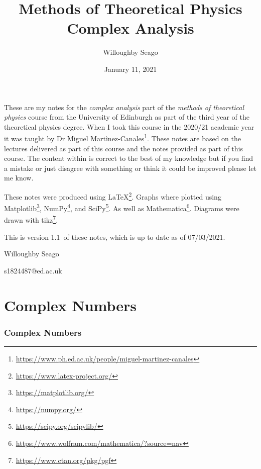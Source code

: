 \documentclass{article}
\author{Willoughby Seago}
\date{January 11, 2021}
\title{
    Methods of Theoretical Physics\\
    {\Large Complex Analysis}
}
\newcommand{\notesVersion}{1.1}
\newcommand{\notesDate}{07/03/2021}
\begin{document}
    \maketitle
    These are my notes for the \textit{complex analysis} part of the \textit{methods of theoretical physics} course from the University of Edinburgh as part of the third year of the theoretical physics degree.
    When I took this course in the 2020/21 academic year it was taught by Dr Miguel Mart\`inez-Canales\footnote{\url{https://www.ph.ed.ac.uk/people/miguel-martinez-canales}}.
    These notes are based on the lectures delivered as part of this course and the notes provided as part of this course.
    The content within is correct to the best of my knowledge but if you find a mistake or just disagree with something or think it could be improved please let me know.
    
    These notes were produced using \LaTeX\footnote{\url{https://www.latex-project.org/}}.
    Graphs where plotted using Matplotlib\footnote{\url{https://matplotlib.org/}}, NumPy\footnote{\url{https://numpy.org/}}, and SciPy\footnote{\url{https://scipy.org/scipylib/}}.
    As well as Mathematica\footnote{\url{https://www.wolfram.com/mathematica/?source=nav}}.
    Diagrams were drawn with tikz\footnote{\url{https://www.ctan.org/pkg/pgf}}.
    
    This is version \notesVersion~of these notes, which is up to date as of \notesDate.
    \begin{flushright}
        Willoughby Seago
        
        s1824487@ed.ac.uk
    \end{flushright}
    \clearpage
    \tableofcontents
    \listoffigures
    \printglossary[type=\acronymtype, title=Acronyms]
    \clearpage
    \begingroup
    \let\clearpage\relax  %
    \endgroup
    \part{Complex Numbers}
    \section{Complex Numbers}
\end{document}
